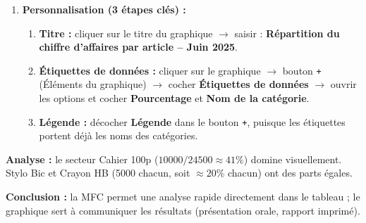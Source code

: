 \documentclass[11pt]{article}
\begin{document}
\begin{exoresolu}
\begin{enumerate}
\begin{enumerate}
        \item \textbf{Personnalisation (3 étapes clés) :}
        \begin{enumerate}
            \item \textbf{Titre :} cliquer sur le titre du graphique $\rightarrow$ saisir : \textbf{\og{}Répartition du chiffre d'affaires par article -- Juin 2025\fg{}}.
            \item \textbf{Étiquettes de données :} cliquer sur le graphique $\rightarrow$ bouton \texttt{+} (Éléments du graphique) $\rightarrow$ cocher \textbf{Étiquettes de données} $\rightarrow$ ouvrir les options et cocher \textbf{Pourcentage} et \textbf{Nom de la catégorie}.
            \item \textbf{Légende :} décocher \textbf{Légende} dans le bouton \texttt{+}, puisque les étiquettes portent déjà les noms des catégories.
        \end{enumerate}
    \end{enumerate}
    \textbf{Analyse :} le secteur \og{}Cahier 100p\fg{} ($10000/24500 \approx 41\%$) domine visuellement. \og{}Stylo Bic\fg{} et \og{}Crayon HB\fg{} (5000 chacun, soit $\approx 20\%$ chacun) ont des parts égales.
\end{enumerate}
\textbf{Conclusion :} la MFC permet une analyse rapide directement dans le tableau ; le graphique sert à communiquer les résultats (présentation orale, rapport imprimé).
\end{exoresolu}
\end{document}
